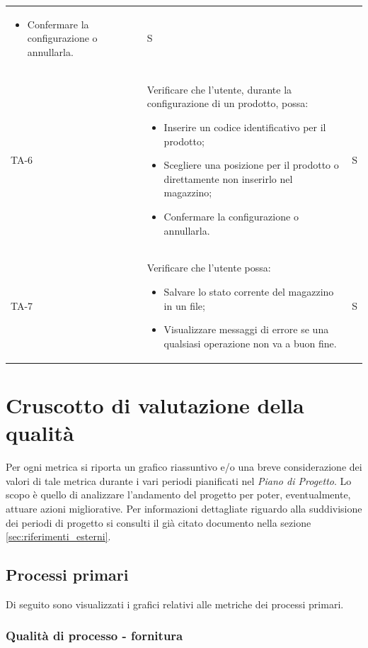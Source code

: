 \begin{xltabular}{0.9\textwidth}{X | p{0.7\textwidth} | X}
\begin{itemize}
        \item Confermare la configurazione o annullarla.
    \end{itemize} 
    & S \\
    TA-6 & Verificare che l'utente, durante la configurazione di un prodotto, possa:
    \begin{itemize}
        \item Inserire un codice identificativo per il prodotto;
        \item Scegliere una posizione per il prodotto o direttamente non inserirlo nel magazzino;
        \item Confermare la configurazione o annullarla.
    \end{itemize} 
    & S \\
    TA-7 & Verificare che l'utente possa:
    \begin{itemize}
        \item Salvare lo stato corrente del magazzino in un file;
        \item Visualizzare messaggi di errore se una qualsiasi operazione non va a buon fine.
    \end{itemize} 
    & S \\
    \hline
\end{xltabular}


\newpage
\section{Cruscotto di valutazione della qualità}\label{resoconto}
Per ogni metrica si riporta un grafico riassuntivo e/o una breve considerazione dei valori di tale metrica durante i vari periodi pianificati nel \textit{Piano di Progetto}. Lo scopo è quello di analizzare l'andamento del progetto per poter, eventualmente, attuare azioni migliorative. Per informazioni dettagliate riguardo alla suddivisione dei periodi di progetto si consulti il già citato documento nella sezione \ref{sec:riferimenti_esterni}.

\subsection{Processi primari} \label{sec:processi_primari}
Di seguito sono visualizzati i grafici relativi alle metriche dei processi primari. 
\subsubsection{Qualità di processo - fornitura}
